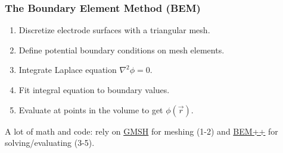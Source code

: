 \documentclass[xcolor=dvipsnames]{beamer}
\begin{document}
\begin{frame}
  \frametitle{The Boundary Element Method (BEM)}

  \begin{enumerate}
  \item Discretize electrode surfaces with a triangular mesh.
  \item Define potential boundary conditions on mesh elements.
  \item Integrate Laplace equation $\nabla^2\phi=0$.
  \item Fit integral equation to boundary values.
  \item Evaluate at points in the volume to get $\phi(\vec{r})$.
  \end{enumerate}

  A lot of math and code: rely on \href{http://gmsh.info/}{GMSH} for
  meshing (1-2) and \href{http://www.bempp.org/}{BEM++} for
  solving/evaluating (3-5).

\end{frame}
\end{document}
